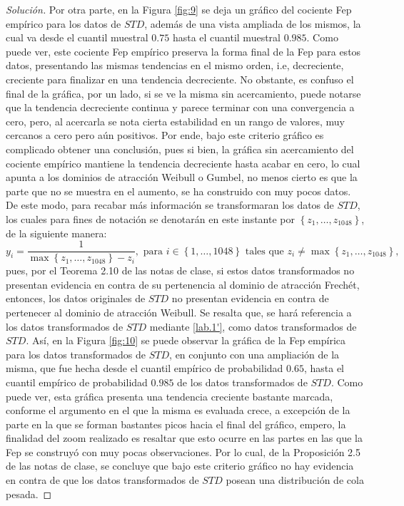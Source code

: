 \documentclass[10.5pt,notitlepage]{article}
\newenvironment{solucion}
  {\begin{proof}[Solución]}
  {\end{proof}}
\newcommand{\kis}[1]{\left\{ #1 \right\}}
\theoremstyle{plain}
\begin{document}
\begin{solucion}
Por otra parte, en la Figura \ref{fig:9} se deja un gráfico del cociente Fep empírico para los datos de \(STD\), además de una vista ampliada de los mismos, la cual va desde el cuantil muestral \(0.75\) hasta el cuantil muestral \(0.985\). Como puede ver, este cociente Fep empírico preserva la forma final de la Fep para estos datos, presentando las mismas tendencias en el mismo orden, i.e, decreciente, creciente para finalizar en una tendencia decreciente. No obstante, es confuso el final de la gráfica, por un lado, si se ve la misma sin acercamiento, puede notarse que la tendencia decreciente continua y parece terminar con una convergencia a cero, pero, al acercarla se nota cierta estabilidad en un rango de valores, muy cercanos a cero pero aún positivos. Por ende, bajo este criterio gráfico es complicado obtener una conclusión, pues si bien, la gráfica sin acercamiento del cociente empírico mantiene la tendencia decreciente hasta acabar en cero, lo cual apunta a los dominios de atracción Weibull o Gumbel, no menos cierto es que la parte que no se muestra en el aumento, se ha construido con muy pocos datos. De este modo, para recabar más información se transformaran los datos de \(STD\), los cuales para fines de notación se denotarán en este instante por \(\kis{z_1, \hdots, z_{1048}}\), de la siguiente manera:
\begin{equation}\label{lab.1'}
y_i = \frac{1}{\max\kis{z_1, \hdots, z_{1048}} - z_i}, \text{ para  } i \in \kis{1, \hdots, 1048} \text{ tales que } z_i \neq  \max\kis{z_1, \hdots, z_{1048}},    
\end{equation}
pues, por el Teorema 2.10 de las notas de clase, si estos datos transformados no presentan evidencia en contra de su pertenencia al dominio de atracción Frechét, entonces, los datos originales de \(STD\) no presentan evidencia en contra de pertenecer al dominio de atracción Weibull. Se resalta que, se hará referencia a los datos transformados de \(STD\) mediante \eqref{lab.1'}, como datos transformados de \(STD\). Así, en la Figura \ref{fig:10} se puede observar la gráfica de la Fep empírica para los datos transformados de \(STD\), en conjunto con una ampliación de la misma, que fue hecha desde el cuantil empírico de probabilidad \(0.65\), hasta el cuantil empírico de probabilidad \(0.985\) de los datos transformados de \(STD\). Como puede ver, esta gráfica presenta una tendencia creciente bastante marcada, conforme el argumento en el que la misma es evaluada crece, a excepción de la parte en la que se forman bastantes picos hacia el final del gráfico, empero, la finalidad del zoom realizado es resaltar que esto ocurre en las partes en las que la Fep se construyó con muy pocas observaciones. Por lo cual, de la Proposición 2.5 de las notas de clase, se concluye que bajo este criterio gráfico no hay evidencia en contra de que los datos transformados de \(STD\) posean una distribución de cola pesada. 


\end{solucion}
\end{document}
